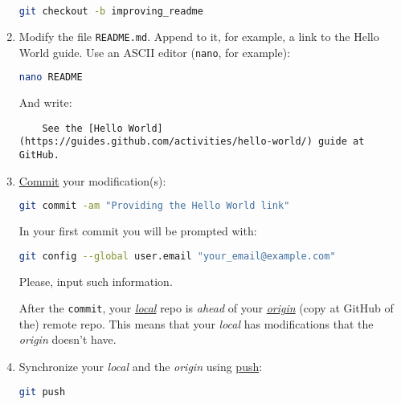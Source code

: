 \begin{enumerate}
  \begin{lstlisting}[language=bash]
    git checkout -b improving_readme
  \end{lstlisting}
  
\item Modify the file \texttt{README.md}. Append to it, for example, a
  link to the Hello World guide. Use an ASCII editor (\texttt{nano},
  for example):

  \begin{lstlisting}[language=bash]
    nano README
  \end{lstlisting}

  And write:
  
  \begin{lstlisting}
    See the [Hello World](https://guides.github.com/activities/hello-world/) guide at GitHub.
  \end{lstlisting}
  
\item
  \href{https://docs.github.com/en/github/getting-started-with-github/github-glossary#commit}{Commit}
  your modification(s):

  \begin{lstlisting}[language=bash, showstringspaces=false, upquote=true]
    git commit -am "Providing the Hello World link"
  \end{lstlisting}

  In your first commit you will be prompted with:

  \begin{lstlisting}[language=bash]
    git config --global user.email "your_email@example.com"
  \end{lstlisting}

  Please, input such information.
  
  After the \texttt{commit}, your \href{https://docs.github.com/en/github/getting-started-with-github/github-glossary#fetch}{\emph{local}} repo is \emph{ahead} of
  your
  \href{https://docs.github.com/en/github/getting-started-with-github/github-glossary#origin}{\emph{origin}}
  (copy at GitHub of the) remote repo. This means that your
  \emph{local} has modifications that the \emph{origin} doesn't have.

\item Synchronize your \emph{local} and the \emph{origin} using
  \href{https://docs.github.com/en/github/getting-started-with-github/github-glossary#push}{push}:

  \begin{lstlisting}[language=bash]
    git push
  \end{lstlisting}


\end{enumerate}
